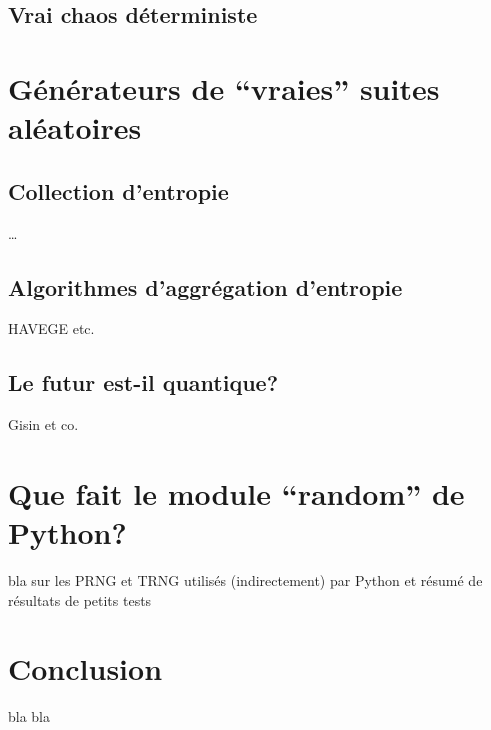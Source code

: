\documentclass{scrartcl}
\begin{document}
\subsection{Vrai chaos déterministe}

\section{Générateurs de ``vraies'' suites aléatoires}
\subsection{Collection d'entropie}
\ldots
\subsection{Algorithmes d'aggrégation d'entropie}
HAVEGE etc.
\subsection{Le futur est-il quantique?}
Gisin et co.

\section{Que fait le module ``random'' de Python?}
bla sur les PRNG et TRNG utilisés (indirectement) par Python et résumé de
résultats de petits tests

\section{Conclusion}
bla bla

\printbibliography
\end{document}
